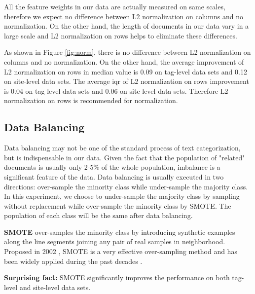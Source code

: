 \documentclass{sig-alternate-05-2015}
\begin{document}
All the feature weights in our data are actually measured on same scales, therefore we expect no difference between L2 normalization on columns and no normalization. On the other hand, the length of documents in our data vary in a large scale and L2 normalization on rows helps to eliminate these differences.

As shown in Figure \ref{fig:norm}, there is no difference between L2 normalization on columns and no normalization. On the other hand, the average improvement of L2 normalization on rows in median value is 0.09 on tag-level data sets and 0.12 on site-level data sets. The average iqr of L2 normalization on rows improvement is 0.04 on tag-level data sets and 0.06 on site-level data sets. Therefore L2 normalization on rows is recommended for normalization.



\subsection{Data Balancing}
\label{sect:Data Balancing}

Data balancing may not be one of the standard process of text categorization, but is indispensable in our data. Given the fact that the population of "related" documents is usually only 2-5\% of the whole population, imbalance is a significant feature of the data. Data balancing is usually executed in two directions: over-sample the minority class while under-sample the majority class. In this experiment, we choose to under-sample the majority class by sampling without replacement while over-sample the minority class by SMOTE. The population of each class will be the same after data balancing.

\textbf{SMOTE} over-samples the minority class by introducing synthetic examples along the line segments joining any pair of real samples in neighborhood.  Proposed in 2002 \cite{chawla2002smote}, SMOTE is a very effective over-sampling method and has been widely applied during the past decades \cite{han2005borderline,bunkhumpornpat2009safe,luengo2011addressing}. 


\textbf{Surprising fact:} SMOTE significantly improves the performance on both tag-level and site-level data sets.
\end{document}
